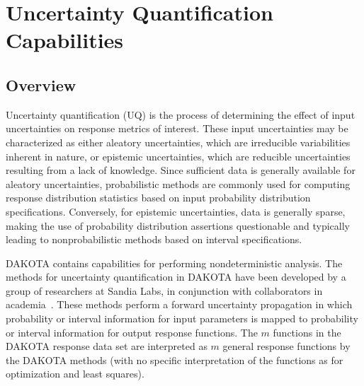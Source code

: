 \chapter{Uncertainty Quantification Capabilities}\label{uq}

\section{Overview}\label{uq:overview}

Uncertainty quantification (UQ) is the process of determining the
effect of input uncertainties on response metrics of interest.  These
input uncertainties may be characterized as either aleatory
uncertainties, which are irreducible variabilities inherent in nature,
or epistemic uncertainties, which are reducible uncertainties
resulting from a lack of knowledge.  Since sufficient data is
generally available for aleatory uncertainties, probabilistic methods
are commonly used for computing response distribution statistics based
on input probability distribution specifications.  Conversely, for
epistemic uncertainties, data is generally sparse, making the use of
probability distribution assertions questionable and typically leading
to nonprobabilistic methods based on interval specifications.

DAKOTA contains capabilities for performing nondeterministic analysis.
The methods for uncertainty quantification in DAKOTA have been
developed by a group of researchers at Sandia Labs, in conjunction
with collaborators in academia~\cite{Gha99,Gha91,Eld05,Tang10a}.
These methods perform a forward uncertainty propagation in which
probability or interval information for input parameters is mapped to
probability or interval information for output response functions. The
$m$ functions in the DAKOTA response data set are interpreted as $m$
general response functions by the DAKOTA methods (with no specific
interpretation of the functions as for optimization and least squares).

